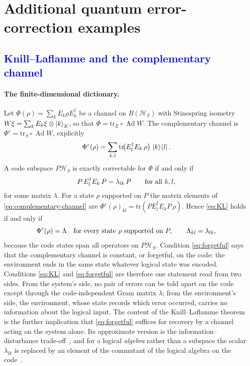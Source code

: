 \documentclass[a4paper,11pt]{article}
\theoremstyle{definition}
\newcommand{\NL}[1]{\textcolor{blue}{#1}}
\newcommand{\tr}{\text{tr}}
\newcommand{\Ad}{\operatorname{Ad}}
\begin{document}
\section{Additional quantum error-correction examples}\label{app:extra-qec-examples}

\subsection{\NL{Knill--Laflamme and the complementary channel}}
\label{app:finite-KL}

\paragraph{The finite-dimensional dictionary.}
Let $\Phi(\rho)=\sum_kE_k\rho E_k^\dagger$ be a channel on $B(\mathcal H_S)$ with Stinespring isometry $W\xi=\sum_kE_k\xi\otimes\ket{k}_E$, so that $\Phi=\tr_E\circ\Ad W$. The complementary channel is $\Phi^c=\tr_S\circ\Ad W$, explicitly
\begin{equation}
 \Phi^c(\rho)=\sum_{k,l}\tr\!\bigl(E_l^\dagger E_k\,\rho\bigr)\,\ket{k}\!\bra{l}.
 \label{eq:complementary-channel}
\end{equation}
A code subspace $P\mathcal H_S$ is exactly correctable for $\Phi$ if and only if~\cite{KnillLaflamme1997}
\begin{equation}
 P\,E_l^\dagger E_k\,P=\lambda_{lk}\,P\qquad\hbox{for all }k,l,
 \label{eq:KL}
\end{equation}
for some matrix $\lambda$. For a state $\rho$ supported on $P$ the matrix elements of \eqref{eq:complementary-channel} are $\Phi^c(\rho)_{kl}=\tr(PE_l^\dagger E_kP\,\rho)$. Hence \eqref{eq:KL} holds if and only if
\begin{equation}
 \Phi^c(\rho)=\Lambda\quad\hbox{for every state $\rho$ supported on }P,\qquad\Lambda_{kl}=\lambda_{lk},
 \label{eq:forgetful}
\end{equation}
because the code states span all operators on $P\mathcal H_S$. Condition \eqref{eq:forgetful} says that the complementary channel is constant, or forgetful, on the code: the environment ends in the same state whatever logical state was encoded. Conditions \eqref{eq:KL} and \eqref{eq:forgetful} are therefore one statement read from two sides. From the system's side, no pair of errors can be told apart on the code except through the code-independent Gram matrix $\lambda$; from the environment's side, the environment, whose state records which error occurred, carries no information about the logical input. The content of the Knill--Laflamme theorem is the further implication that \eqref{eq:forgetful} suffices for recovery by a channel acting on the system alone. Its approximate version is the information--disturbance trade-off~\cite{SchumacherWestmoreland2002,KretschmannSchlingemannWerner2008}, and for a logical \emph{algebra} rather than a subspace the scalar $\lambda_{lk}$ is replaced by an element of the commutant of the logical algebra on the code~\cite{BenyKempfKribs2007}.
\end{document}
